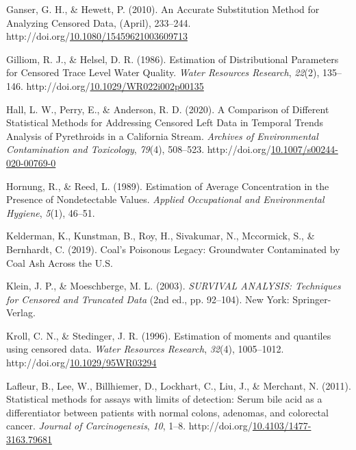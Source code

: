 \documentclass[12pt, twoside]{amherstthesis}
\newenvironment{CSLReferences}%
  {}%
  {\par}
\begin{document}
\begin{CSLReferences}{1}{0}
\leavevmode\hypertarget{ref-Ganser2010}{}%
Ganser, G. H., \& Hewett, P. (2010). {An Accurate Substitution Method for Analyzing Censored Data}, (April), 233--244. http://doi.org/\href{https://doi.org/10.1080/15459621003609713}{10.1080/15459621003609713}

\leavevmode\hypertarget{ref-Gilliom1986}{}%
Gilliom, R. J., \& Helsel, D. R. (1986). {Estimation of Distributional Parameters for Censored Trace Level Water Quality}. \emph{Water Resources Research}, \emph{22}(2), 135--146. http://doi.org/\href{https://doi.org/10.1029/WR022i002p00135}{10.1029/WR022i002p00135}

\leavevmode\hypertarget{ref-Hall2020}{}%
Hall, L. W., Perry, E., \& Anderson, R. D. (2020). {A Comparison of Different Statistical Methods for Addressing Censored Left Data in Temporal Trends Analysis of Pyrethroids in a California Stream}. \emph{Archives of Environmental Contamination and Toxicology}, \emph{79}(4), 508--523. http://doi.org/\href{https://doi.org/10.1007/s00244-020-00769-0}{10.1007/s00244-020-00769-0}

\leavevmode\hypertarget{ref-Hornung1989}{}%
Hornung, R., \& Reed, L. (1989). {Estimation of Average Concentration in the Presence of Nondetectable Values}. \emph{Applied Occupational and Environmental Hygiene}, \emph{5}(1), 46--51.

\leavevmode\hypertarget{ref-Kelderman2019}{}%
Kelderman, K., Kunstman, B., Roy, H., Sivakumar, N., Mccormick, S., \& Bernhardt, C. (2019). {Coal's Poisonous Legacy: Groundwater Contaminated by Coal Ash Across the U.S.}

\leavevmode\hypertarget{ref-Klein2003}{}%
Klein, J. P., \& Moeschberge, M. L. (2003). \emph{{SURVIVAL ANALYSIS: Techniques for Censored and Truncated Data}} (2nd ed., pp. 92--104). New York: Springer-Verlag.

\leavevmode\hypertarget{ref-Kroll1996}{}%
Kroll, C. N., \& Stedinger, J. R. (1996). {Estimation of moments and quantiles using censored data}. \emph{Water Resources Research}, \emph{32}(4), 1005--1012. http://doi.org/\href{https://doi.org/10.1029/95WR03294}{10.1029/95WR03294}

\leavevmode\hypertarget{ref-Lafleur2011}{}%
Lafleur, B., Lee, W., Billhiemer, D., Lockhart, C., Liu, J., \& Merchant, N. (2011). {Statistical methods for assays with limits of detection: Serum bile acid as a differentiator between patients with normal colons, adenomas, and colorectal cancer}. \emph{Journal of Carcinogenesis}, \emph{10}, 1--8. http://doi.org/\href{https://doi.org/10.4103/1477-3163.79681}{10.4103/1477-3163.79681}


\end{CSLReferences}
\end{document}
